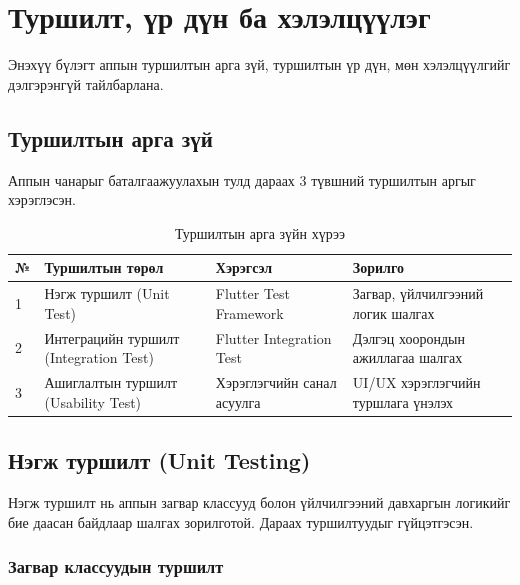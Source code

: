 \newpage
\pagestyle{plain}
\chapter{Туршилт, үр дүн ба хэлэлцүүлэг}

Энэхүү бүлэгт аппын туршилтын арга зүй, туршилтын үр дүн, мөн хэлэлцүүлгийг дэлгэрэнгүй тайлбарлана.

\section{Туршилтын арга зүй}

Аппын чанарыг баталгаажуулахын тулд дараах 3 түвшний туршилтын аргыг хэрэглэсэн.

\begin{table}[htbp]
\centering
\begin{tabular}{|p{0.8cm}|p{3.5cm}|p{4cm}|p{5cm}|}
\hline
\textbf{№} & \textbf{Туршилтын төрөл} & \textbf{Хэрэгсэл} & \textbf{Зорилго} \\
\hline
1 & Нэгж туршилт (Unit Test) & Flutter Test Framework & Загвар, үйлчилгээний логик шалгах \\
\hline
2 & Интеграцийн туршилт (Integration Test) & Flutter Integration Test & Дэлгэц хоорондын ажиллагаа шалгах \\
\hline
3 & Ашиглалтын туршилт (Usability Test) & Хэрэглэгчийн санал асуулга & UI/UX хэрэглэгчийн туршлага үнэлэх \\
\hline
\end{tabular}
\caption{Туршилтын арга зүйн хүрээ}
\label{tab:test_methods}
\end{table}

\section{Нэгж туршилт (Unit Testing)}

Нэгж туршилт нь аппын загвар классууд болон үйлчилгээний давхаргын логикийг бие даасан байдлаар шалгах зорилготой. Дараах туршилтуудыг гүйцэтгэсэн.

\subsection{Загвар классуудын туршилт}

